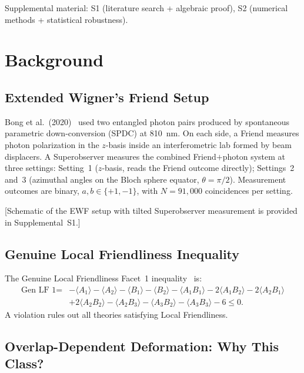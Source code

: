 \documentclass[twocolumn,aps,pra,superscriptaddress,floatfix,10pt]{revtex4-2}
\begin{document}
Supplemental material: S1 (literature search + algebraic proof), S2
(numerical methods + statistical robustness).

\section{Background}
\label{sec:background}

\subsection{Extended Wigner's Friend Setup}
\label{sec:ewf}

Bong et al.\ (2020)~\cite{Bong2020} used two entangled photon pairs produced by spontaneous
parametric down-conversion (SPDC) at 810~nm. On each side, a Friend measures
photon polarization in the $z$-basis inside an interferometric lab formed by beam
displacers. A Superobserver measures the combined Friend$+$photon system at three
settings: Setting~1 ($z$-basis, reads the Friend outcome directly); Settings~2 and~3
(azimuthal angles on the Bloch sphere equator, $\theta = \pi/2$). Measurement outcomes
are binary, $a, b \in \{+1, -1\}$, with $N = 91{,}000$ coincidences per setting.

[Schematic of the EWF setup with tilted Superobserver measurement is provided in Supplemental~S1.]

\subsection{Genuine Local Friendliness Inequality}
\label{sec:gen_lf}

The Genuine Local Friendliness Facet~1 inequality~\cite{Bong2020} is:
\begin{equation}
\begin{split}
\text{Gen LF 1} = & -\langle A_1\rangle - \langle A_2\rangle
- \langle B_1\rangle - \langle B_2\rangle - \langle A_1 B_1\rangle
- 2\langle A_1 B_2\rangle - 2\langle A_2 B_1\rangle \\
& + 2\langle A_2 B_2\rangle - \langle A_2 B_3\rangle
- \langle A_3 B_2\rangle - \langle A_3 B_3\rangle - 6 \le 0.
\end{split}
\label{eq:gen_lf1}
\end{equation}
A violation rules out all theories satisfying Local Friendliness.

\subsection{Overlap-Dependent Deformation: Why This Class?}
\label{sec:why_class}
\end{document}
